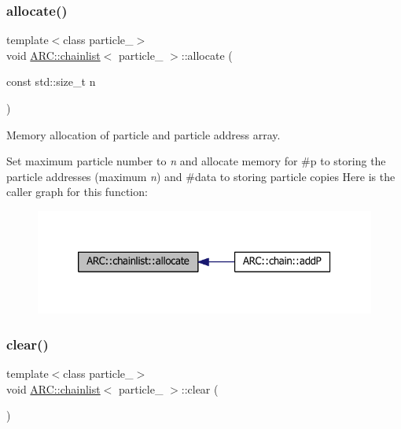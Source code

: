 \subsubsection{\texorpdfstring{allocate()}{allocate()}}
{\footnotesize\ttfamily template$<$class particle\+\_\+$>$ \\
void \hyperlink{classARC_1_1chainlist}{A\+R\+C\+::chainlist}$<$ particle\+\_\+ $>$\+::allocate (\begin{DoxyParamCaption}\item[{const std\+::size\+\_\+t}]{n }\end{DoxyParamCaption})\hspace{0.3cm}{\ttfamily [inline]}}



Memory allocation of particle and particle address array. 

Set maximum particle number to {\itshape n} and allocate memory for \#p to storing the particle addresses (maximum {\itshape n}) and \#data to storing particle copies Here is the caller graph for this function\+:
\nopagebreak
\begin{figure}[H]
\begin{center}
\leavevmode
\includegraphics[width=326pt]{classARC_1_1chainlist_ab212df89ec5a2e81ce7525adc04001c1_icgraph}
\end{center}
\end{figure}
\hypertarget{classARC_1_1chainlist_af6b33790ba054657d9e132c177ed7f04}{}\label{classARC_1_1chainlist_af6b33790ba054657d9e132c177ed7f04} 
\subsubsection{\texorpdfstring{clear()}{clear()}}
{\footnotesize\ttfamily template$<$class particle\+\_\+$>$ \\
void \hyperlink{classARC_1_1chainlist}{A\+R\+C\+::chainlist}$<$ particle\+\_\+ $>$\+::clear (\begin{DoxyParamCaption}{ }\end{DoxyParamCaption})\hspace{0.3cm}{\ttfamily [inline]}}



